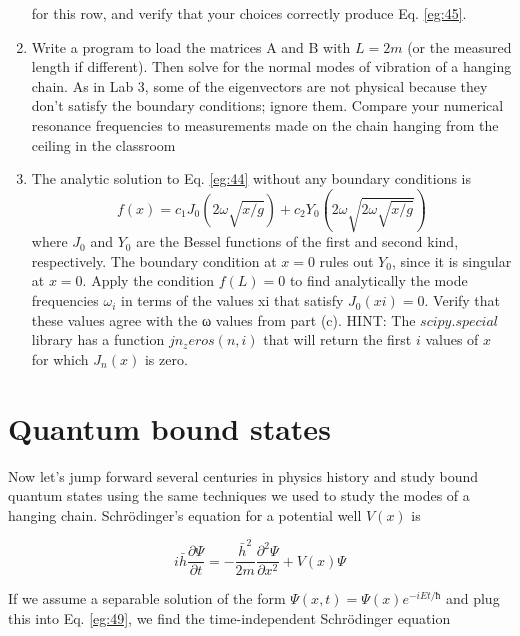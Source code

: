 \documentclass{book}
\theoremstyle{plain}
\theoremstyle{definition}
\numberwithin{exm}{chapter}
\theoremstyle{remark}
\theoremstyle{summary}
\theoremstyle{overview}
\begin{document}
\begin{enumerate}[label=(\alph*)]
for this row, and verify that your choices correctly produce Eq. \eqref{eg:45}.
\item Write a program to load the matrices A and B with $L = 2 m$ (or the measured length if different). Then solve for the normal modes of vibration
of a hanging chain. As in Lab 3, some of the eigenvectors are not physical because they don’t satisfy the boundary conditions; ignore them.
Compare your numerical resonance frequencies to measurements
made on the chain hanging from the ceiling in the classroom
\item The analytic solution to Eq. \eqref{eg:44} without any boundary conditions is
\begin{equation*}
		f(x) = c_1J_0(2\omega \sqrt{x / g}) + c_2 Y_0(2\omega \sqrt{2\omega \sqrt{x / g}})
				\end{equation*}
				where $J_0$ and $Y_0$ are the Bessel functions of the first and second kind,
respectively. The boundary condition at $x = 0$ rules out $Y_0$, since it is
singular at $x = 0$. Apply the condition $f(L) = 0$ to find analytically the
mode frequencies $ \omega_i$
in terms of the values xi that satisfy $J_0(xi) = 0$.
Verify that these values agree with the ω values from part (c).
HINT: The $scipy.special$ library has a function $jn_zeros(n,i)$
that will return the first $i$ values of $x$ for which $J_n(x)$ is zero.
				\end{enumerate}
				

\section*{Quantum bound states}
Now let\rq s jump forward several centuries in physics history and study bound
quantum states using the same techniques we used to study the modes of a
hanging chain. Schrödinger\rq s equation for a potential well $V(x)$ is

\begin{equation}\label{eq:49}	
i \bar{h} \frac{\partial \Psi}{\partial t} = - \frac{\bar{h}^{2}}{2 m} \frac{\partial^{2} \Psi}{\partial x^{2}}+V(x) \Psi
				\end{equation}
				
		If we assume a separable solution of the form $\Psi(x,t) = \Psi(x)e^{
−i Et/ħ}$
and plug this
into Eq. \eqref{eg:49}, we find the time-independent Schrödinger equation
\end{document}
